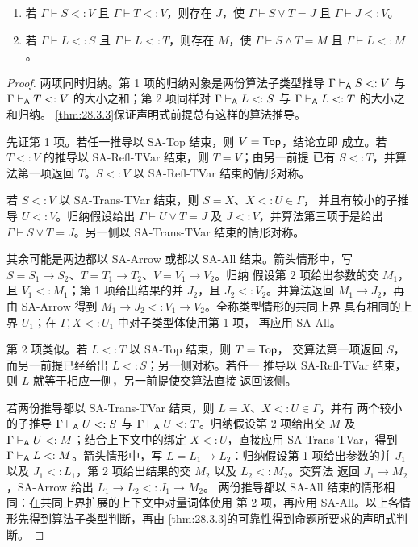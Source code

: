 \taplstatementliststart
\begin{proposition}
\label{prop:28.6.2}
\taplstatementlistbreak
\begin{enumerate}
  \item 若 \(\Gamma\vdash S<:V\) 且
        \(\Gamma\vdash T<:V\)，则存在 \(J\)，使
        \(\Gamma\vdash S\lor T=J\) 且
        \(\Gamma\vdash J<:V\)。
  \item 若 \(\Gamma\vdash L<:S\) 且
        \(\Gamma\vdash L<:T\)，则存在 \(M\)，使
        \(\Gamma\vdash S\land T=M\) 且
        \(\Gamma\vdash L<:M\)。
\end{enumerate}
\end{proposition}
\begin{proof}
两项同时归纳。第 1 项的归纳对象是两份算法子类型推导
\(\Gamma\mathrel{\vdash_{\mathsf A}} S<:V\) 与
\(\Gamma\mathrel{\vdash_{\mathsf A}} T<:V\) 的大小之和；第 2 项同样对
\(\Gamma\mathrel{\vdash_{\mathsf A}} L<:S\) 与
\(\Gamma\mathrel{\vdash_{\mathsf A}} L<:T\) 的大小之和归纳。
\cref{thm:28.3.3}保证声明式前提总有这样的算法推导。

先证第 1 项。若任一推导以 SA-Top 结束，则 \(V=\mathsf{Top}\)，结论立即
成立。若 \(T<:V\) 的推导以 SA-Refl-TVar 结束，则 \(T=V\)；由另一前提
已有 \(S<:T\)，并算法第一项返回 \(T\)。\(S<:V\) 以 SA-Refl-TVar
结束的情形对称。

若 \(S<:V\) 以 SA-Trans-TVar 结束，则 \(S=X\)、\(X<:U\in\Gamma\)，
并且有较小的子推导 \(U<:V\)。归纳假设给出
\(\Gamma\vdash U\lor T=J\) 及 \(J<:V\)，并算法第三项于是给出
\(\Gamma\vdash S\lor T=J\)。另一侧以 SA-Trans-TVar 结束的情形对称。

其余可能是两边都以 SA-Arrow 或都以 SA-All 结束。箭头情形中，写
\(S=S_1\to S_2\)、\(T=T_1\to T_2\)、\(V=V_1\to V_2\)。归纳
假设第 2 项给出参数的交 \(M_1\)，且 \(V_1<:M_1\)；第 1 项给出结果的并
\(J_2\)，且 \(J_2<:V_2\)。并算法返回 \(M_1\to J_2\)，再由
SA-Arrow 得到 \(M_1\to J_2<:V_1\to V_2\)。全称类型情形的共同上界
具有相同的上界 \(U_1\)；在 \(\Gamma,X<:U_1\) 中对子类型体使用第 1 项，
再应用 SA-All。

第 2 项类似。若 \(L<:T\) 以 SA-Top 结束，则 \(T=\mathsf{Top}\)，
交算法第一项返回 \(S\)，而另一前提已经给出 \(L<:S\)；另一侧对称。若任一
推导以 SA-Refl-TVar 结束，则 \(L\) 就等于相应一侧，另一前提使交算法直接
返回该侧。

若两份推导都以 SA-Trans-TVar 结束，则 \(L=X\)、\(X<:U\in\Gamma\)，并有
两个较小的子推导 \(\Gamma\mathrel{\vdash_{\mathsf A}} U<:S\) 与
\(\Gamma\mathrel{\vdash_{\mathsf A}} U<:T\)。归纳假设第 2 项给出交 \(M\) 及
\(\Gamma\mathrel{\vdash_{\mathsf A}} U<:M\)；结合上下文中的绑定 \(X<:U\)，直接应用
SA-Trans-TVar，得到 \(\Gamma\mathrel{\vdash_{\mathsf A}} L<:M\)。箭头情形中，写
\(L=L_1\to L_2\)：归纳假设第 1 项给出参数的并 \(J_1\) 以及
\(J_1<:L_1\)，第 2 项给出结果的交 \(M_2\) 以及 \(L_2<:M_2\)。交算法
返回 \(J_1\to M_2\)，SA-Arrow 给出 \(L_1\to L_2<:J_1\to M_2\)。
两份推导都以 SA-All 结束的情形相同：在共同上界扩展的上下文中对量词体使用
第 2 项，再应用 SA-All。以上各情形先得到算法子类型判断，再由
\cref{thm:28.3.3}的可靠性得到命题所要求的声明式判断。
\end{proof}

